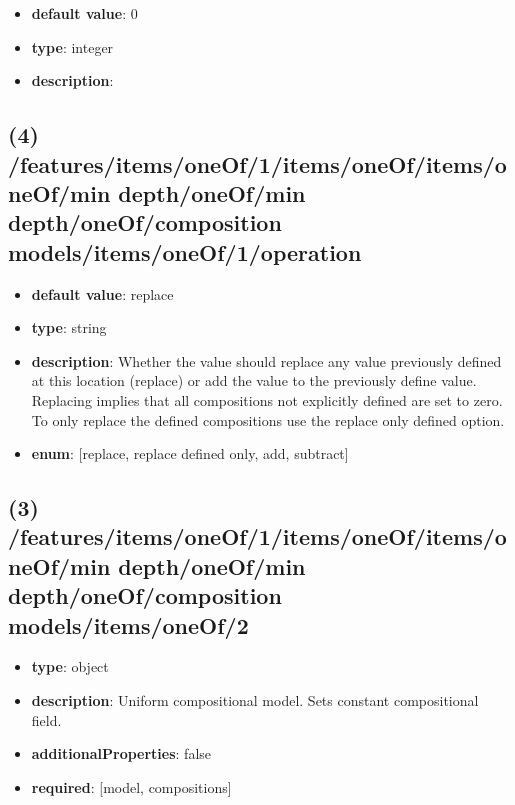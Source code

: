 \begin{itemize}[leftmargin=5em]\item {\bf default value}: 0
\item {\bf type}: integer
\item {\bf description}: 
\end{itemize}\subsection{(4) /features/items/oneOf/1/items/oneOf/items/oneOf/min depth/oneOf/min depth/oneOf/composition models/items/oneOf/1/operation}
\begin{itemize}[leftmargin=4em]\item {\bf default value}: replace
\item {\bf type}: string
\item {\bf description}: Whether the value should replace any value previously defined at this location (replace) or add the value to the previously define value. Replacing implies that all compositions not explicitly defined are set to zero. To only replace the defined compositions use the replace only defined option.
\item {\bf enum}: [replace, replace defined only, add, subtract]\end{itemize}\subsection{(3) /features/items/oneOf/1/items/oneOf/items/oneOf/min depth/oneOf/min depth/oneOf/composition models/items/oneOf/2}
\begin{itemize}[leftmargin=3em]\item {\bf type}: object
\item {\bf description}: Uniform compositional model. Sets constant compositional field.
\item {\bf additionalProperties}: false
\item {\bf required}: [model, compositions]\end{itemize}
